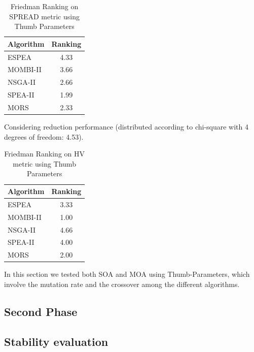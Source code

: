 \par
\begin{table}[!htp]
\centering
\begin{tabular}{lc}
\toprule
Algorithm&Ranking\\
\midrule
ESPEA&4.33\\
MOMBI-II&3.66\\
NSGA-II&2.66\\
SPEA-II&1.99\\
MORS&2.33\\
\bottomrule
\end{tabular}
\caption{Friedman Ranking on SPREAD metric using Thumb Parameters}
\label{tab:fried_spread_thumb}
Considering reduction performance (distributed according to chi-square with 4 degrees of freedom: 4.53).
\end{table}

\par
\begin{table}[!htp]
\centering
\begin{tabular}{lc}
\toprule
Algorithm&Ranking\\
\midrule
ESPEA&3.33\\
MOMBI-II&1.00\\
NSGA-II&4.66\\
SPEA-II&4.00\\
MORS&2.00\\
\bottomrule
\end{tabular}
\caption{Friedman Ranking on HV metric using Thumb Parameters}
\label{tab:fried_hv_thumb}
\end{table}


In this section we tested both SOA and MOA using Thumb-Parameters, which involve the mutation rate and the crossover among the different algorithms.

\subsection{Second Phase}
\label{sec:second-phase}


\subsection{Stability evaluation}

